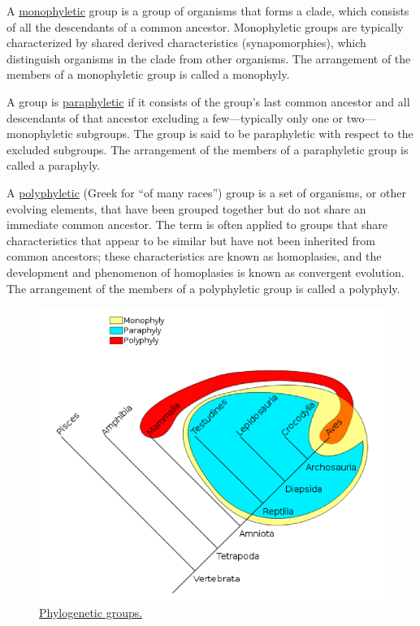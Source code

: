 A \href{https://en.wikipedia.org/wiki/Monophyly}{monophyletic} group is
a group of organisms that forms a clade, which consists of all the
descendants of a common ancestor. Monophyletic groups are typically
characterized by shared derived characteristics (synapomorphies), which
distinguish organisms in the clade from other organisms. The arrangement
of the members of a monophyletic group is called a monophyly.

A group is \href{https://en.wikipedia.org/wiki/Paraphyly}{paraphyletic}
if it consists of the group's last common ancestor and all descendants
of that ancestor excluding a few---typically only one or
two---monophyletic subgroups. The group is said to be paraphyletic with
respect to the excluded subgroups. The arrangement of the members of a
paraphyletic group is called a paraphyly.

A \href{https://en.wikipedia.org/wiki/Polyphyly}{polyphyletic} (Greek
for ``of many races'') group is a set of organisms, or other evolving
elements, that have been grouped together but do not share an immediate
common ancestor. The term is often applied to groups that share
characteristics that appear to be similar but have not been inherited
from common ancestors; these characteristics are known as homoplasies,
and the development and phenomenon of homoplasies is known as convergent
evolution. The arrangement of the members of a polyphyletic group is
called a polyphyly.

\begin{figure}

{\centering \includegraphics[width=0.7\linewidth]{./figures/appendix1/phylogenetic_groups}

}

\caption{\href{https://commons.wikimedia.org/wiki/File:Phylogenetic-Groups.svg}{Phylogenetic
groups.}}\label{fig:phylogeny}
\end{figure}


